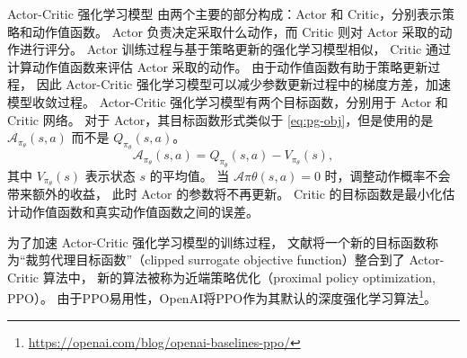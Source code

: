 Actor-Critic 强化学习模型 \cite{MBMGLHSK16} 由两个主要的部分构成：Actor 和 Critic，分别表示策略和动作值函数。
Actor 负责决定采取什么动作，而 Critic 则对 Actor 采取的动作进行评分。
Actor 训练过程与基于策略更新的强化学习模型相似，
Critic 通过计算动作值函数来评估 Actor 采取的动作。
由于动作值函数有助于策略更新过程，
因此 Actor-Critic 强化学习模型可以减少参数更新过程中的梯度方差，加速模型收敛过程。
Actor-Critic 强化学习模型有两个目标函数，分别用于 Actor 和 Critic 网络。
对于 Actor，其目标函数形式类似于 \autoref{eq:pg-obj}，但是使用的是 $\mathcal{A}_{\pi_{\theta}}(s, a)$ 而不是 $Q_{\pi_{\theta}}(s, a)$。
\begin{equation}
    \mathcal{A}_{\pi_{\theta}}(s, a)=Q_{\pi_{\theta}}(s, a)-V_{\pi_{\theta}}(s), 
\end{equation}
其中 $V_{\pi_{\theta}}(s)$ 表示状态 $s$ 的平均值。
当 $\mathcal{A}{\pi{\theta}}(s, a) = 0$ 时，调整动作概率不会带来额外的收益，
此时 Actor 的参数将不再更新。
Critic 的目标函数是最小化估计动作值函数和真实动作值函数之间的误差。

为了加速 Actor-Critic 强化学习模型的训练过程\cite{SLAJM15}，
文献{\rm\parencite{SWDRK17,HTSLMWTEWERS17}}将一个新的目标函数称为“裁剪代理目标函数”（clipped surrogate objective function）整合到了 Actor-Critic 算法中，
新的算法被称为近端策略优化（proximal policy optimization, PPO）。
由于PPO易用性，OpenAI将PPO作为其默认的深度强化学习算法\footnote{\url{https://openai.com/blog/openai-baselines-ppo/}}。

